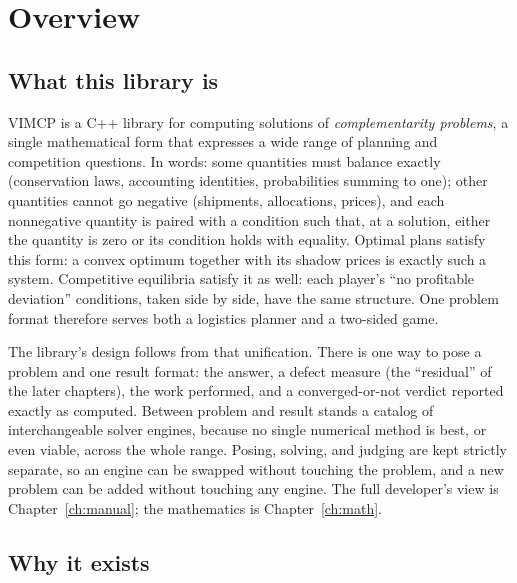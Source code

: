 \chapter{Overview}
\label{ch:overview}

\section{What this library is}
\label{sec:o-what}

VIMCP is a C++ library for computing solutions of \emph{complementarity
problems}, a single mathematical form that expresses a wide range of
planning and competition questions. In words: some quantities must balance
exactly (conservation laws, accounting identities, probabilities summing to
one); other quantities cannot go negative (shipments, allocations, prices),
and each nonnegative quantity is paired with a condition such that, at a
solution, either the quantity is zero or its condition holds with equality.
Optimal plans satisfy this form: a convex optimum together with its shadow
prices is exactly such a system. Competitive equilibria satisfy it as well:
each player's ``no profitable deviation'' conditions, taken side by side,
have the same structure. One problem format therefore serves both a
logistics planner and a two-sided game.

The library's design follows from that unification. There is one way to
pose a problem and one result format: the answer, a defect measure (the
``residual'' of the later chapters), the work performed, and a
converged-or-not verdict reported exactly as computed. Between problem and
result stands a catalog of interchangeable solver engines, because no
single numerical method is best, or even viable, across the whole range.
Posing, solving, and judging are kept strictly separate, so an engine can
be swapped without touching the problem, and a new problem can be added
without touching any engine. The full developer's view is
Chapter~\ref{ch:manual}; the mathematics is Chapter~\ref{ch:math}.

\section{Why it exists}
\label{sec:o-why}

